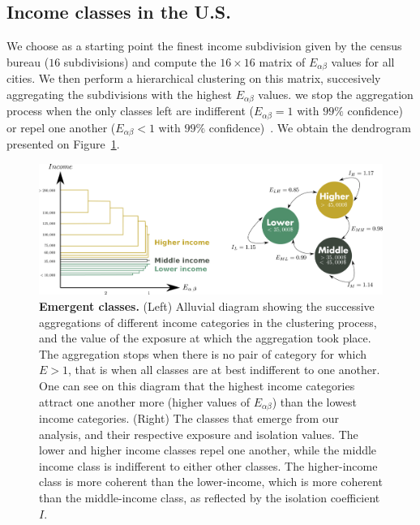 \subsection{Income classes in the U.S.}
\label{sub:income_classes_in_the_u_s_}

We choose as a starting point the finest income subdivision given by the census
bureau ($16$ subdivisions) and compute the $16 \times 16$ matrix of $E_{\alpha
\beta}$ values for all cities. We then perform a hierarchical clustering on this
matrix, succesively aggregating the subdivisions with the highest $E_{\alpha
\beta}$ values. we stop the aggregation process when the only classes left are
indifferent ($E_{\alpha \beta} = 1$ with $99\%$ confidence) or
repel one another ($E_{\alpha \beta} < 1$ with $99\%$
confidence)~\cite{Louf:2015}. We obtain the dendrogram presented on
Figure~\ref{fig:classes_alluvial}.

\begin{figure}
    \includegraphics[width=\textwidth]{./gfx/chapter-segregation/figure1.pdf}
    \caption{{\bf Emergent classes.} (Left) Alluvial diagram showing the successive aggregations
      of different income categories in the clustering process, and
      the value of the exposure at which the aggregation took
      place. The aggregation stops when there is no pair of category
      for which $E>1$, that is when all classes are at best
      indifferent to one another. One can see on this diagram that
      the highest income categories attract one another more (higher values of
      $E_{\alpha \beta}$) than the lowest income categories. (Right) The classes that emerge from our
      analysis, and their respective exposure and isolation values. The lower
      and higher income classes repel one another, while the middle
      income class is indifferent to either other classes.  The
      higher-income class is more coherent than the lower-income,
      which is more coherent than the middle-income class, as
      reflected by the isolation coefficient $I$.}
\label{fig:classes_alluvial}
\end{figure}

